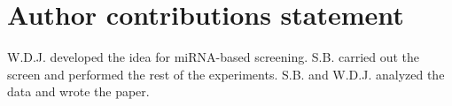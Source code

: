 \section*{Author contributions statement}

W.D.J. developed the idea for miRNA-based screening. S.B. carried out the screen and performed the rest of the experiments. S.B. and W.D.J. analyzed the data and wrote the paper.